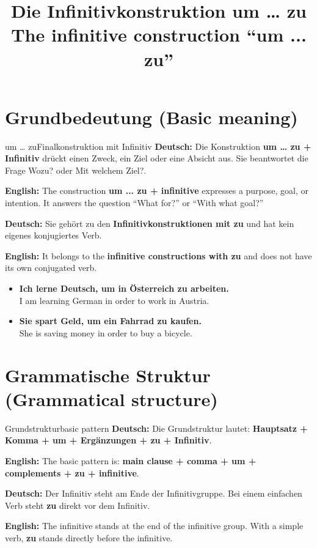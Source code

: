 \documentclass[a4paper,11pt]{article}
\title{Die Infinitivkonstruktion \glqq um \ldots{} zu\grqq\\\large \textnormal{The infinitive construction ``um ... zu''}}
\date{}
\newcommand{\GermanText}[1]{\textbf{Deutsch: }#1\par}
\newcommand{\EnglishText}[1]{{\small\color{SoftGray}\textbf{English: }#1\par}}
\newcommand{\ExampleItem}[2]{\item \textbf{#1}\\{\small\color{SoftGray}#2}}
\begin{document}
    \maketitle
    \tableofcontents
    \newpage

    \section{Grundbedeutung \textnormal{(Basic meaning)}}

        \begin{grammarentry}{um \ldots{} zu}{Finalkonstruktion mit Infinitiv}
            \GermanText{Die Konstruktion \textbf{um \ldots{} zu + Infinitiv} drückt einen Zweck, ein Ziel oder eine Absicht aus. Sie beantwortet die Frage \glqq Wozu?\grqq{} oder \glqq Mit welchem Ziel?\grqq.}
            \EnglishText{The construction \textbf{um ... zu + infinitive} expresses a purpose, goal, or intention. It answers the question ``What for?'' or ``With what goal?''}

            \GermanText{Sie gehört zu den \textbf{Infinitivkonstruktionen mit zu} und hat kein eigenes konjugiertes Verb.}
            \EnglishText{It belongs to the \textbf{infinitive constructions with zu} and does not have its own conjugated verb.}
        \end{grammarentry}

        \begin{exbox}
            \begin{itemize}
                \ExampleItem{Ich lerne Deutsch, um in Österreich zu arbeiten.}{I am learning German in order to work in Austria.}
                \ExampleItem{Sie spart Geld, um ein Fahrrad zu kaufen.}{She is saving money in order to buy a bicycle.}
            \end{itemize}
        \end{exbox}


    \section{Grammatische Struktur \textnormal{(Grammatical structure)}}

        \begin{grammarentry}{Grundstruktur}{basic pattern}
            \GermanText{Die Grundstruktur lautet: \textbf{Hauptsatz + Komma + um + Ergänzungen + zu + Infinitiv}.}
            \EnglishText{The basic pattern is: \textbf{main clause + comma + um + complements + zu + infinitive}.}

            \GermanText{Der Infinitiv steht am Ende der Infinitivgruppe. Bei einem einfachen Verb steht \textbf{zu} direkt vor dem Infinitiv.}
            \EnglishText{The infinitive stands at the end of the infinitive group. With a simple verb, \textbf{zu} stands directly before the infinitive.}
        \end{grammarentry}
\end{document}
